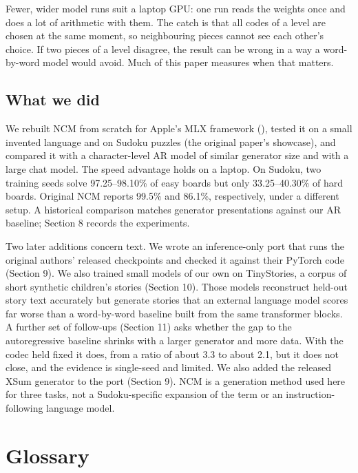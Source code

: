 \documentclass[
  british,
]{article}
\begin{document}
Fewer, wider model runs suit a laptop GPU: one run reads the weights
once and does a lot of arithmetic with them. The catch is that all codes
of a level are chosen at the same moment, so neighbouring pieces cannot
see each other's choice. If two pieces of a level disagree, the result
can be wrong in a way a word-by-word model would avoid. Much of this
paper measures when that matters.

\subsection{What we did}\label{what-we-did}

We rebuilt NCM from scratch for Apple's MLX framework
(), tested it on a small
invented language and on Sudoku puzzles (the original paper's showcase),
and compared it with a character-level AR model of similar generator
size and with a large chat model. The speed advantage holds on a laptop.
On Sudoku, two training seeds solve 97.25--98.10\% of easy boards but
only 33.25--40.30\% of hard boards. Original NCM reports 99.5\% and
86.1\%, respectively, under a different setup. A historical comparison
matches generator presentations against our AR baseline; Section 8
records the experiments.

Two later additions concern text. We wrote an inference-only port that
runs the original authors' released checkpoints and checked it against
their PyTorch code (Section 9). We also trained small models of our own
on TinyStories, a corpus of short synthetic children's stories (Section
10). Those models reconstruct held-out story text accurately but
generate stories that an external language model scores far worse than a
word-by-word baseline built from the same transformer blocks. A further
set of follow-ups (Section 11) asks whether the gap to the
autoregressive baseline shrinks with a larger generator and more data.
With the codec held fixed it does, from a ratio of about 3.3 to about
2.1, but it does not close, and the evidence is single-seed and limited.
We also added the released XSum generator to the port (Section 9). NCM
is a generation method used here for three tasks, not a Sudoku-specific
expansion of the term or an instruction-following language model.

\section{Glossary}\label{glossary}
\end{document}
